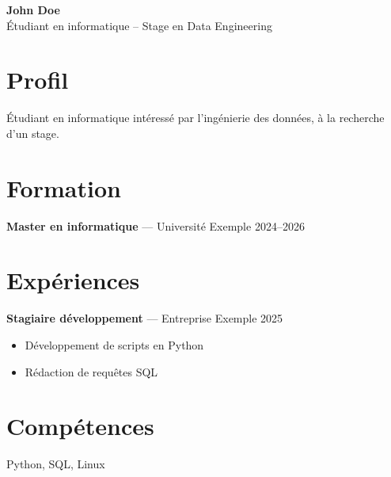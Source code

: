 \documentclass[11pt,a4paper]{article}
\begin{document}
\begin{center}
{\LARGE\bfseries John Doe }\\[3pt]
Étudiant en informatique – Stage en Data Engineering
\end{center}

\section*{Profil}
Étudiant en informatique intéressé par l’ingénierie des données, à la recherche d’un stage.

\section*{Formation}

\textbf{Master en informatique} --- Université Exemple \hfill 2024–2026\par


\section*{Expériences}

\textbf{Stagiaire développement} --- Entreprise Exemple \hfill 2025\par
\begin{itemize}

\item Développement de scripts en Python

\item Rédaction de requêtes SQL

\end{itemize}


\section*{Compétences}
Python, SQL, Linux
\end{document}
